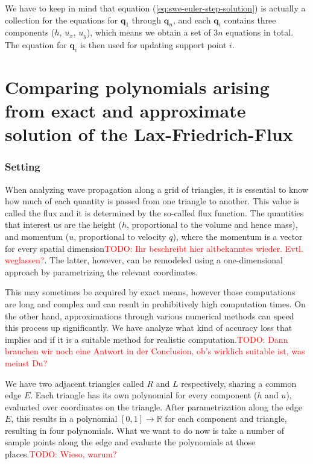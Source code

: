 \documentclass{article}
\newcommand{\todo}[2][]{\textcolor{red}{TODO\ifthenelse{\equal{#1}{}}{}{[#1]}: #2}}
\newcommand{\reals}{\mathbb{R}}
\begin{document}
We have to keep in mind that equation (\ref{eq:swe-euler-step-solution}) is actually a collection for the equations for $\mathbf{q}_1$ through $\mathbf{q}_n$, and each $\mathbf{q}_i$ contains three components ($h$, $u_x$, $u_y$), which means we obtain a set of $3n$ equations in total. The equation for $\mathbf{q}_i$ is then used for updating support point $i$.







\newpage
\part{Comparing polynomials arising from exact and approximate solution of the Lax-Friedrich-Flux}
\label{part:polynomial-comparison}

\section{Setting}
\label{sec:setting}

When analyzing wave propagation along a grid of triangles, it is essential to know how much of each quantity is passed from one triangle to another. This value is called the flux and it is determined by the so-called flux function. The quantities that interest us are the height ($h$, proportional to the volume and hence mass), and momentum ($u$, proportional to velocity $q$), where the momentum is a vector for every spatial dimension\todo{Ihr beschreibt hier altbekanntes wieder. Evtl. weglassen?}. The latter, however, can be remodeled using a one-dimensional approach by parametrizing the relevant coordinates.

This may sometimes be acquired by exact means, however those computations are long and complex and can result in prohibitively high computation times. On the other hand, approximations through various numerical methods can speed this process up significantly. We have analyze what kind of accuracy loss that implies and if it is a suitable method for realistic computation.\todo{Dann brauchen wir noch eine Antwort in der Conclusion, ob's wirklich suitable ist, was meinst Du?}

We have two adjacent triangles called $R$ and $L$ respectively, sharing a common edge $E$.
Each triangle has its own polynomial for every component ($h$ and $u$), evaluated over coordinates on the triangle. After parametrization along the edge $E$, this results in a polynomial $[0,1]\rightarrow\reals$ for each component and triangle, resulting in four polynomials.
What we want to do now is take a number of sample points along the edge and evaluate the polynomials at those places.\todo{Wieso, warum?}
\end{document}
